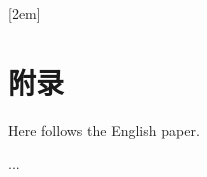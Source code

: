 
[2em]{\vspace{.5\baselineskip}\xiaosan\song}%
             {\prechaptername\CJKnumber{\thecontentslabel}\postchaptername\qquad}{} %
             {}             %
\chapter*{附录}

Here follows the English paper.

...